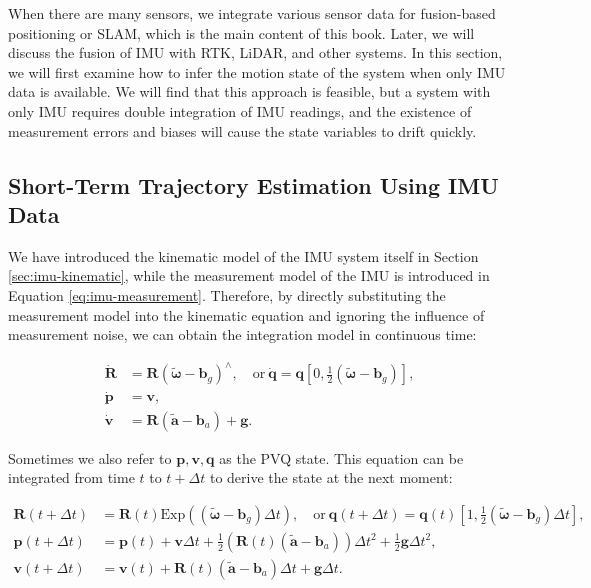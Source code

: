 When there are many sensors, we integrate various sensor data for fusion-based positioning or SLAM, which is the main content of this book. Later, we will discuss the fusion of IMU with RTK, LiDAR, and other systems. In this section, we will first examine how to infer the motion state of the system when only IMU data is available. We will find that this approach is feasible, but a system with only IMU requires double integration of IMU readings, and the existence of measurement errors and biases will cause the state variables to drift quickly.

\subsection{Short-Term Trajectory Estimation Using IMU Data}

We have introduced the kinematic model of the IMU system itself in Section \ref{sec:imu-kinematic}, while the measurement model of the IMU is introduced in Equation \eqref{eq:imu-measurement}. Therefore, by directly substituting the measurement model into the kinematic equation and ignoring the influence of measurement noise, we can obtain the integration model in continuous time:

\begin{subequations}\label{key}
	\begin{align}
		\dot{\mathbf{R}} &= \mathbf{R} (\tilde{\boldsymbol{\omega}} - \mathbf{b}_g )^\wedge, \quad \text{or} \ 
		\dot{\mathbf{q}} = \mathbf{q} \left[0, \frac{1}{2} \left( \tilde{\boldsymbol{\omega}} -\mathbf{b}_g\right) 
		\right], \\
		\dot{\mathbf{p}} &= \mathbf{v}, \\
		\dot{\mathbf{v}} &= \mathbf{R} (\tilde{\mathbf{a}} - \mathbf{b}_a) + \mathbf{g}.
	\end{align}
\end{subequations}

Sometimes we also refer to $\mathbf{p}, \mathbf{v}, \mathbf{q}$ as the PVQ state. This equation can be integrated from time $t$ to $t+\Delta t$ to derive the state at the next moment:

\begin{subequations}\label{eq:3.14}
	\begin{align}
		\mathbf{R}(t+\Delta t) &= \mathbf{R}(t) \mathrm{Exp} \left( (\tilde{\boldsymbol{\omega}}-\mathbf{b}_g) \Delta 
		t \right),\quad \text{or} \ \mathbf{q}(t+\Delta t) = \mathbf{q}(t) \left[ 1, \frac{1}{2} \left( 
		\tilde{\boldsymbol{\omega}} - \mathbf{b}_g\right) \Delta t\right], \\
		\mathbf{p}(t+\Delta t) &= \mathbf{p}(t) + \mathbf{v} \Delta t + \frac{1}{2} \left(\mathbf{R}(t)(\tilde{\mathbf{a}}-\mathbf{b}_a) 
		\right) \Delta t^2 + \frac{1}{2} \mathbf{g} \Delta t^2, \\
		\mathbf{v}(t+\Delta t) &= \mathbf{v}(t) + \mathbf{R}(t) (\tilde{\mathbf{a}} - \mathbf{b}_a) \Delta t + \mathbf{g} \Delta t	.
	\end{align}
\end{subequations}

